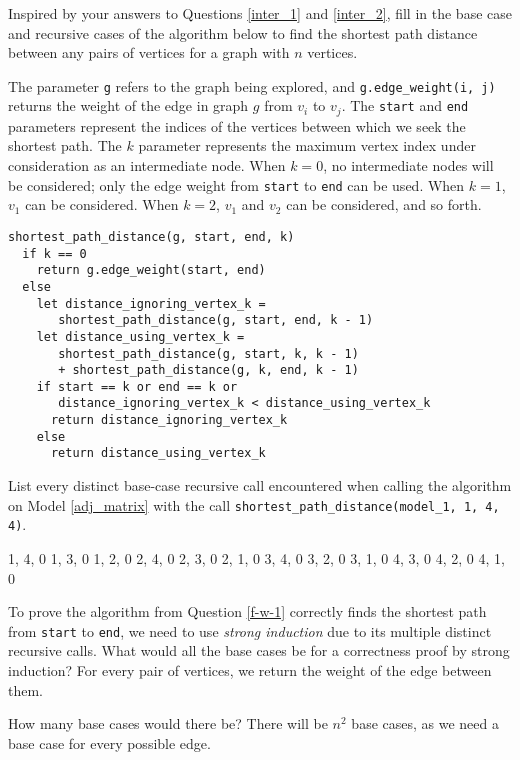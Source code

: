 \documentclass{tufte-handout}
\begin{document}
\begin{questions}
\item Inspired by your answers to Questions \ref{inter_1} and \ref{inter_2}, fill in the base case and recursive cases of the algorithm below to find the shortest path distance between any pairs of vertices for a graph with $n$ vertices. 

The parameter \verb|g| refers to the graph being explored, and \verb|g.edge_weight(i, j)| returns the weight of the edge in graph $g$ from $v_i$ to $v_j$. The \verb|start| and \verb|end| parameters represent the indices of the vertices between which we seek the shortest path. The $k$ parameter represents the maximum vertex index under consideration as an intermediate node. When $k = 0$, no intermediate nodes will be considered; only the edge weight from \verb|start| to \verb|end| can be used. When $k=1$, $v_1$ can be considered. When $k=2$, $v_1$ and $v_2$ can be considered, and so forth. \label{f-w-1}

{\color{red}
\begin{verbatim}
shortest_path_distance(g, start, end, k)
  if k == 0
    return g.edge_weight(start, end)
  else 
    let distance_ignoring_vertex_k = 
       shortest_path_distance(g, start, end, k - 1)
    let distance_using_vertex_k = 
       shortest_path_distance(g, start, k, k - 1) 
       + shortest_path_distance(g, k, end, k - 1)
    if start == k or end == k or 
       distance_ignoring_vertex_k < distance_using_vertex_k
      return distance_ignoring_vertex_k
    else 
      return distance_using_vertex_k
\end{verbatim}
}

\item List every distinct base-case recursive call encountered when calling the algorithm on Model \ref{adj_matrix} with the call \verb|shortest_path_distance(model_1, 1, 4, 4)|.

{\color{red}
1, 4, 0
1, 3, 0
1, 2, 0
2, 4, 0
2, 3, 0
2, 1, 0
3, 4, 0
3, 2, 0
3, 1, 0
4, 3, 0
4, 2, 0
4, 1, 0
}

\item To prove the algorithm from Question \ref{f-w-1} correctly finds the shortest path from \verb|start| to \verb|end|, we need to use \emph{strong induction} due to its multiple distinct recursive calls.  What would all the base cases be for a correctness proof by strong induction?  {\color{red} For every pair of vertices, we return the weight of the edge between them.}

\item How many base cases would there be?  {\color{red} There will be $n^2$ base cases, as we need a base case for every possible edge.}


\end{questions}
\end{document}

